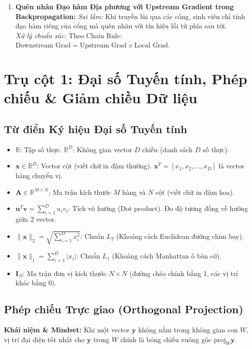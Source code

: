 \documentclass[11pt,a4paper]{article}
\begin{document}
\begin{bottleneckbox}
\begin{enumerate}
    \item \textbf{Quên nhân Đạo hàm Địa phương với Upstream Gradient trong Backpropagation:}
    \textit{Sai lầm:} Khi truyền lùi qua các cổng, sinh viên chỉ tính đạo hàm riêng của cổng mà quên nhân với tín hiệu lỗi từ phía sau tới.\\
    \textit{Xử lý chuẩn xác:} Theo Chain Rule: $\text{Downstream Grad} = \text{Upstream Grad} \times \text{Local Grad}$.
\end{enumerate}
\end{bottleneckbox}

\newpage
\section{Trụ cột 1: Đại số Tuyến tính, Phép chiếu \& Giảm chiều Dữ liệu}

\subsection{Từ điển Ký hiệu Đại số Tuyến tính}
\begin{symbolbox}
\begin{itemize}
    \item $\mathbb{R}$: Tập số thực. $\mathbb{R}^D$: Không gian vector $D$ chiều (danh sách $D$ số thực).
    \item $\mathbf{x} \in \mathbb{R}^D$: Vector cột (viết chữ in đậm thường). $\mathbf{x}^T = [x_1, x_2, \dots, x_D]$ là vector hàng chuyển vị.
    \item $\mathbf{A} \in \mathbb{R}^{M \times N}$: Ma trận kích thước $M$ hàng và $N$ cột (viết chữ in đậm hoa).
    \item $\mathbf{u}^T \mathbf{v} = \sum_{i=1}^D u_i v_i$: Tích vô hướng (Dot product). Đo độ tương đồng về hướng giữa 2 vector.
    \item $\|\mathbf{x}\|_2 = \sqrt{\sum_{i=1}^D x_i^2}$: Chuẩn $L_2$ (Khoảng cách Euclidean đường chim bay).
    \item $\|\mathbf{x}\|_1 = \sum_{i=1}^D |x_i|$: Chuẩn $L_1$ (Khoảng cách Manhattan ô bàn cờ).
    \item $\mathbf{I}_N$: Ma trận đơn vị kích thước $N \times N$ (đường chéo chính bằng 1, các vị trí khác bằng 0).
\end{itemize}
\end{symbolbox}

\subsection{Phép chiếu Trực giao (Orthogonal Projection)}
\textbf{Khái niệm & Mindset:} Khi một vector $\mathbf{y}$ không nằm trong không gian con $W$, vị trí đại diện tốt nhất cho $\mathbf{y}$ trong $W$ chính là bóng chiếu vuông góc $\text{proj}_W \mathbf{y}$.
\end{document}
